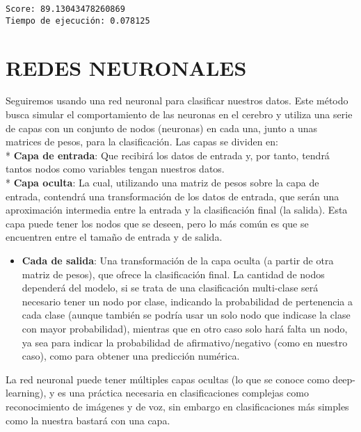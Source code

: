 \documentclass[11pt]{article}
\providecommand{\tightlist}{%
      \setlength{\itemsep}{0pt}\setlength{\parskip}{0pt}}
\begin{document}
    \begin{Verbatim}[commandchars=\\\{\}]
Score: 89.13043478260869
Tiempo de ejecución: 0.078125

    \end{Verbatim}

    \section{REDES NEURONALES}\label{redes-neuronales}

    Seguiremos usando una red neuronal para clasificar nuestros datos. Este
método busca simular el comportamiento de las neuronas en el cerebro y
utiliza una serie de capas con un conjunto de nodos (neuronas) en cada
una, junto a unas matrices de pesos, para la clasificación. Las capas se
dividen en:\\
* \textbf{Capa de entrada}: Que recibirá los datos de entrada y, por
tanto, tendrá tantos nodos como variables tengan nuestros datos.\\
* \textbf{Capa oculta}: La cual, utilizando una matriz de pesos sobre la
capa de entrada, contendrá una transformación de los datos de entrada,
que serán una aproximación intermedia entre la entrada y la
clasificación final (la salida). Esta capa puede tener los nodos que se
deseen, pero lo más común es que se encuentren entre el tamaño de
entrada y de salida.

\begin{itemize}
\tightlist
\item
  \textbf{Cada de salida}: Una transformación de la capa oculta (a
  partir de otra matriz de pesos), que ofrece la clasificación final. La
  cantidad de nodos dependerá del modelo, si se trata de una
  clasificación multi-clase será necesario tener un nodo por clase,
  indicando la probabilidad de pertenencia a cada clase (aunque también
  se podría usar un solo nodo que indicase la clase con mayor
  probabilidad), mientras que en otro caso solo hará falta un nodo, ya
  sea para indicar la probabilidad de afirmativo/negativo (como en
  nuestro caso), como para obtener una predicción numérica.
\end{itemize}

La red neuronal puede tener múltiples capas ocultas (lo que se conoce
como deep-learning), y es una práctica necesaria en clasificaciones
complejas como reconocimiento de imágenes y de voz, sin embargo en
clasificaciones más simples como la nuestra bastará con una capa.
\end{document}
